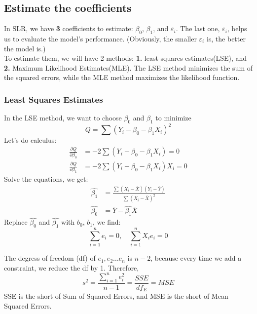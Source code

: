 \documentclass[main]{subfiles}
\begin{document}
\subsection{Estimate the coefficients}
In SLR, we have {\bf 3} coefficients to estimate: $\beta_0$, $\beta_1$, and $\varepsilon_i$. The last one, $\varepsilon_i$, helps us to evaluate the model's performance. (Obviously, the smaller $\varepsilon_i$ is, the better the model is.) \\
To estimate them, we will have 2 methods: {\bf 1.} least squares estimates(LSE), and {\bf 2.} Maximum Likelihood Estimates(MLE). The LSE method minimizes the sum of the squared errors, while the MLE method maximizes the likelihood function. 
\subsubsection{Least Squares Estimates}
In the LSE method, we want to choose $\beta_0$ and $\beta_1$ to minimize
$$ Q = \sum(Y_i-\beta_0-\beta_1 X_i)^{2} $$
Let's do calculus:
\begin{align*}
    \frac{\partial Q}{\partial \beta_0} &= -2\sum(Y_i-\beta_0-\beta_1 X_i) = 0 \\
    \frac{\partial Q}{\partial \beta_1} &= -2\sum(Y_i-\beta_0-\beta_1 X_i)X_i = 0
\end{align*}
Solve the equations, we get:
\begin{align*}
    \hat{\beta_1} &= \frac{\sum(X_i-\bar{X})(Y_i-\bar{Y})}{\sum(X_i-\bar{X})^2} \\
    \hat{\beta_0} &= \bar{Y} - \hat{\beta_1}\bar{X}
\end{align*}
Replace $\hat{\beta_0}$ and $\hat{\beta_1}$ with $b_0$, $b_1$, we find:
$$ \sum_{i=1}^{n}e_i = 0, \quad  \sum_{i=1}^{n}X_i e_i = 0$$
\begin{warn}
    The degress of freedom (df) of $e_1,e_2\dots e_n$ is $n-2$, because every time we add a constraint, we reduce the df by 1. Therefore, 
    $$ s ^{2} = \frac{\sum_{i=1}^{n}e_i^2}{n-1}=\frac{SSE}{df_E}=MSE $$
    SSE is the short of Sum of Squared Errors, and MSE is the short of Mean Squared Errors.
\end{warn}
\end{document}
